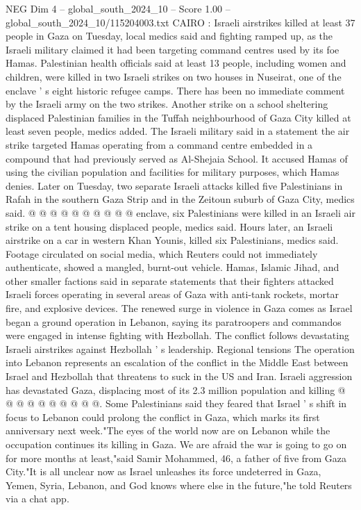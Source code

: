 \begin{textsample}{NEG Dim 4 – global\_south\_2024\_10 – Score 1.00 – global\_south\_2024\_10/115204003.txt}  \label{ex:f4_neg_076}
CAIRO : Israeli airstrikes killed at least 37 people in Gaza on Tuesday, local medics said and fighting ramped up, as the Israeli military claimed it had been targeting command centres used by its foe Hamas.
Palestinian health officials said at least 13 people, including women and children, were killed in two Israeli strikes on two houses in Nuseirat, one of the enclave ' s eight historic refugee camps.
There has been no immediate comment by the Israeli army on the two strikes.
Another strike on a school sheltering displaced Palestinian families in the Tuffah neighbourhood of Gaza City killed at least seven people, medics added.
The Israeli military said in a statement the air strike targeted Hamas operating from a command centre embedded in a compound that had previously served as Al-Shejaia School.
It accused Hamas of using the civilian population and facilities for military purposes, which Hamas denies.
Later on Tuesday, two separate Israeli attacks killed five Palestinians in Rafah in the southern Gaza Strip and in the Zeitoun suburb of Gaza City, medics said. @ @ @ @ @ @ @ @ @ @ enclave, six Palestinians were killed in an Israeli air strike on a tent housing displaced people, medics said.
Hours later, an Israeli airstrike on a car in western Khan Younis, killed six Palestinians, medics said.
Footage circulated on social media, which Reuters could not immediately authenticate, showed a mangled, burnt-out vehicle.
Hamas, Islamic Jihad, and other smaller factions said in separate statements that their fighters attacked Israeli forces operating in several areas of Gaza with anti-tank rockets, mortar fire, and explosive devices.
The renewed surge in violence in Gaza comes as Israel began a ground operation in Lebanon, saying its paratroopers and commandos were engaged in intense fighting with Hezbollah.
The conflict follows devastating Israeli airstrikes against Hezbollah ' s leadership.
Regional tensions The operation into Lebanon represents an escalation of the conflict in the Middle East between Israel and Hezbollah that threatens to suck in the US and Iran.
Israeli aggression has devastated Gaza, displacing most of its 2.3 million population and killing @ @ @ @ @ @ @ @ @ @.
Some Palestinians said they feared that Israel ' s shift in focus to Lebanon could prolong the conflict in Gaza, which marks its first anniversary next week."The eyes of the world now are on Lebanon while the occupation continues its killing in Gaza.
We are afraid the war is going to go on for more months at least,"said Samir Mohammed, 46, a father of five from Gaza City."It is all unclear now as Israel unleashes its force undeterred in Gaza, Yemen, Syria, Lebanon, and God knows where else in the future,"he told Reuters via a chat app.

\end{textsample}
